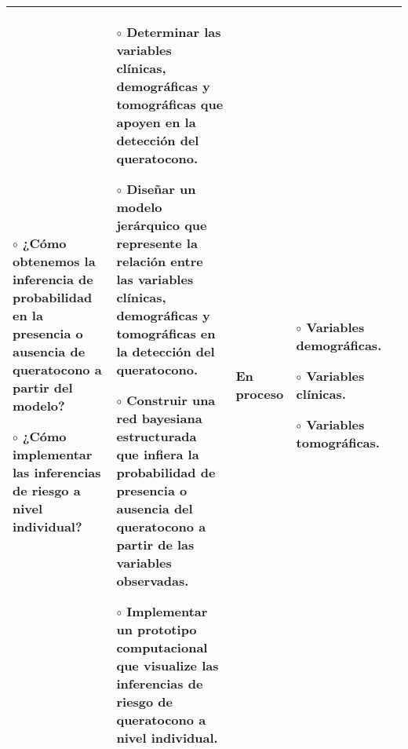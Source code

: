 \begin{landscape}
\begin{table}[h!]
\begin{tabular}{|p{4.2cm}|p{4.5cm}|p{4.5cm}|p{3cm}|p{4.2cm}|}
{    $\circ$ ¿Cómo obtenemos la inferencia de probabilidad en la presencia o ausencia de queratocono a partir del modelo?\vspace{0.2cm}

    $\circ$ ¿Cómo implementar las inferencias de riesgo a nivel individual?} & \multicolumn{1}{p{4.5cm}|}{
    $\circ$ Determinar las variables clínicas, demográficas y tomográficas que apoyen en la detección del queratocono.\vspace{0.2cm}

    $\circ$ Diseñar un modelo jerárquico que represente la relación entre las variables clínicas, demográficas y tomográficas en la detección del queratocono.\vspace{0.2cm}

    $\circ$ Construir una red bayesiana estructurada que infiera la probabilidad de presencia o ausencia del queratocono a partir de las variables observadas.\vspace{0.2cm}

    $\circ$ Implementar un prototipo computacional que visualize las inferencias de riesgo de queratocono a nivel individual.

    } & \multicolumn{1}{p{4.5cm}|}{
    En proceso

    } & \multicolumn{1}{p{3cm}|}{
    \vspace{0.2cm}
    $\circ$ Variables demográficas.\vspace{0.2cm}

    $\circ$ Variables clínicas.\vspace{0.2cm}

    $\circ$ Variables tomográficas.
    }  & \\ \hline
\end{tabular}
\end{table}

\end{landscape}
